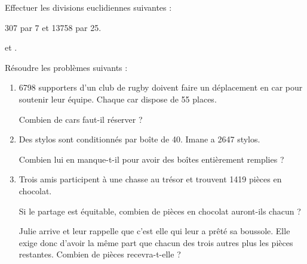 \begin{Maquette}[Fiche,CorrigeFin,Colonnes=2]{}

   \begin{multicols}{2}

      \begin{exercice} %
         Effectuer les divisions euclidiennes suivantes : \par
         307 par 7 \qquad et \qquad \num{13758} par 25.
      \end{exercice} 

      \begin{Solution}
          \hskip1.5cm  \par \smallskip
          \quad et \quad {}.
       \end{Solution}
      

      \begin{exercice} %
         Résoudre les problèmes suivants :
         \begin{enumerate}
            \item \num{6798} supporters d'un club de rugby doivent faire un déplacement en car pour soutenir leur équipe. Chaque car dispose de 55 places. \par
               Combien de cars faut-il réserver ?
            \item Des stylos sont conditionnés par boîte de 40. Imane a \num{2647} stylos. \par
               Combien lui en manque-t-il pour avoir des boîtes entièrement remplies ?
            \item Trois amis participent à une chasse au trésor et trouvent \num{1419} pièces en chocolat. \par
               Si le partage est équitable, combien de pièces en chocolat auront-ils chacun ? \par
               Julie arrive et leur rappelle que c'est elle qui leur a prêté sa boussole. Elle exige donc d'avoir la même part que chacun des trois autres plus les pièces restantes. Combien de pièces recevra-t-elle ?
         \end{enumerate}
      \end{exercice}


\end{multicols}
\end{Maquette}
